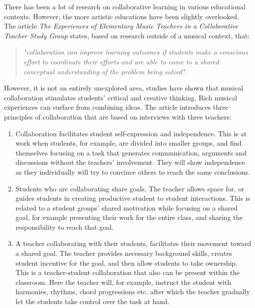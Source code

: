 There has been a lot of research on collaborative learning in various educational contexts. However, the more artistic educations have been slightly overlooked\cite{collaborativeLearningTeachers}\cite{collaborativeMusicAnalysis}\cite{collaborativeLearningReview}. 
The article \textit{The Experiences of Elementary Music Teachers in a Collaborative Teacher Study Group} states, based on research outside of a musical context, that:\\
\begin{quote}
	\textit{"collaboration can improve learning outcomes if students make a conscious effort to coordinate their efforts and are able to come to a shared conceptual understanding of the problem being solved"}\cite{collaborativeLearningTeachers}.\\
\end{quote}
However, it is not an entirely unexplored area, studies have shown that musical collaboration stimulates students' critical and creative thinking\cite{collaborativeLearningTeachers}. Rich musical experiences can surface from combining ideas\cite{collaborativeLearningTeachers}. 
The article introduces three principles of collaboration that are based on interviews with three teachers:\\
\begin{enumerate}
	\item Collaboration facilitates student self-expression and independence. This is at work when students, for example, are divided into smaller groups, and find themselves focusing on a task that generates communication, arguments and discussions without the teachers' involvement. They will show independence as they individually will try to convince others to reach the same conclusions\cite{collaborativeLearningTeachers}.
	\item Students who are collaborating share goals. The teacher allows space for, or guides students in creating productive student to student interactions. This is related to a student groups' shared motivation while focusing on a shared goal, for example presenting their work for the entire class, and sharing the responsibility to reach that goal\cite{collaborativeLearningTeachers}.
	\item A teacher collaborating with their students, facilitates their movement toward a shared goal. The teacher provides necessary background skills, creates student incentive for the goal, and then allow students to take ownership. This is a teacher-student collaboration that also can be present within the classroom. Here the teacher will, for example, instruct the student with harmonies, rhythms, chord progressions etc. after which the teacher gradually let the students take control over the task at hand\cite{collaborativeLearningTeachers}.
\end{enumerate}

